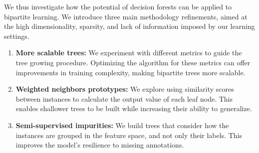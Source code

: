 \begin{itemize}
We thus investigate how the potential of decision forests can be applied to bipartite learning.
%
We introduce three main methodology refinements, aimed at the high dimensionality, sparsity, and lack of information imposed by our learning settings.
%
\begin{enumerate}
    \item \textbf{More scalable trees:}
    We experiment with different metrics to guide the tree growing procedure. Optimizing the algorithm for these metrics can offer improvements in training complexity, making bipartite trees more scalable.

    \item \textbf{Weighted neighbors prototypes:}
    We explore using similarity scores between instances to calculate the output value of each leaf node. This enables shallower trees to be built while increasing their ability to generalize. 

    \item \textbf{Semi-supervised impurities:}
    We build trees that consider how the instances are grouped in the feature space, and not only their labels. This improves the model's resilience to missing annotations.
\end{enumerate}



\end{itemize}
